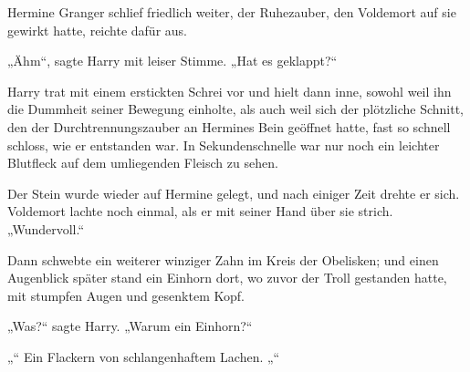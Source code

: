 Hermine Granger schlief friedlich weiter, der Ruhezauber, den Voldemort auf sie gewirkt hatte, reichte dafür aus.

„Ähm“, sagte Harry mit leiser Stimme.
„Hat es geklappt?“


Harry trat mit einem erstickten Schrei vor und hielt dann inne, sowohl weil ihn die Dummheit seiner Bewegung einholte, als auch weil sich der plötzliche Schnitt, den der Durchtrennungszauber an Hermines Bein geöffnet hatte, fast so schnell schloss, wie er entstanden war. In Sekundenschnelle war nur noch ein leichter Blutfleck auf dem umliegenden Fleisch zu sehen.

Der Stein wurde wieder auf Hermine gelegt, und nach einiger Zeit drehte er sich.
Voldemort lachte noch einmal, als er mit seiner Hand über sie strich.
„Wundervoll.“

Dann schwebte ein weiterer winziger Zahn im Kreis der Obelisken; und einen Augenblick später stand ein Einhorn dort, wo zuvor der Troll gestanden hatte, mit stumpfen Augen und gesenktem Kopf.

„Was?“ sagte Harry.
„Warum ein Einhorn?“

„“
Ein Flackern von schlangenhaftem Lachen.
„“

